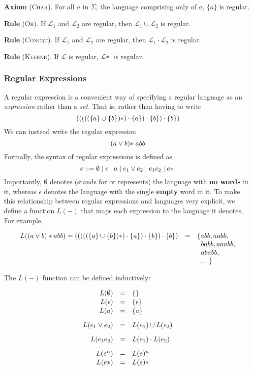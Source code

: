 \textsf{\textbf{Axiom}} \textsc{(Char)}. For all $a$ in $\Sigma$, the language comprising only of $a$, $\{a\}$ is regular.

\textsf{\textbf{Rule}} \textsc{(Or)}. If $\mathcal{L}_1$ and $\mathcal{L}_2$ are regular, then $\mathcal{L}_1 \cup \mathcal{L}_2$ is regular. 

\textsf{\textbf{Rule}} \textsc{(Concat)}. If $\mathcal{L}_1$ and $\mathcal{L}_2$ are regular, then $\mathcal{L}_1 \cdot \mathcal{L}_2$ is regular. 

\textsf{\textbf{Rule}} \textsc{(Kleene)}. If $\mathcal{L}$ is regular,  $\mathcal{L}\*$ is regular. 

\subsubsection{Regular Expressions}
A regular expression is a convenient way of specifying a regular language as an \emph{expression} rather than a \emph{set}. That is, rather than having to write
\[ (((((\{ a \} \cup \{ b \})\*) \cdot \{ a \}) \cdot \{ b \}) \cdot \{ b \}) \]
We can instead write the regular expression
\[ (a \lor b) \* abb \]
Formally, the syntax of regular expressions is defined as
\[ e ::= \emptyset \mid \epsilon \mid a \mid e_1 \lor e_2 \mid e_1 e_2 \mid e\* \]
Importantly, $\emptyset$ denotes (stands for or represents) the language with \textbf{no words} in it, whereas $\epsilon$ denotes the language with the single \textbf{empty} word in it. To make this relationship between regular expressions and languages very explicit, we define a function $L(-)$ that maps each expression to the language it denotes. For example,

\[
\begin{array}{rcl}
L((a \vee b)*abb) = (((((\{ a \} \cup \{ b \})\*) \cdot \{ a \}) \cdot \{ b \}) \cdot \{ b \}) &=& \{ abb, aabb,\\
&&\;\; babb, aaabb,\\
&&\;\; ababb,\\
&&\;\;\ldots\}
\end{array}
\]

The $L(-)$ function can be defined inductively:

\[
\begin{array}{rcl}
L(\emptyset) &=& \{\}\\[0.2ex]
L(\epsilon) &=& \{\epsilon\}\\[0.2ex]
L(a) &=& \{a\}\\[2ex]
L(e_1  \vee  e_2) &=& L(e_1) \cup L(e_2)\\[2ex]
L(e_1e_2) &=& L(e_1) \cdot L(e_2) \\[2ex]
L(e^n) &=& L(e)^n\\[0.2ex]
L(e*) &=& L(e)\*
\end{array}
\]

